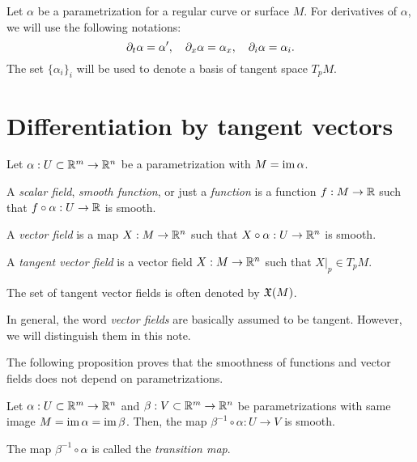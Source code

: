 \documentclass{../note}
\def\a{\alpha}
\begin{document}
\begin{notn*}
Let $\a$ be a parametrization for a regular curve or surface $M$.
For derivatives of $\a$, we will use the following notations:
\[\pd_t\a=\a',\quad\pd_x\a=\a_x,\quad\pd_i\a=\a_i.\]
The set $\{\a_i\}_i$ will be used to denote a basis of tangent space $T_pM$.
\end{notn*}





\section{Differentiation by tangent vectors}


\begin{defn}
Let $\a:U\subset\R^m\to\R^n$ be a parametrization with $M=\im\a$.
\begin{parts}
\item A \emph{scalar field}, \emph{smooth function}, or just a \emph{function} is a function $f:M\to\mathbb{R}$ such that $f\circ\a:U\to\R$ is smooth.
\item A \emph{vector field} is a map $X:M\to\mathbb{R}^n$ such that $X\circ\a:U\to\R^n$ is smooth.
\item A \emph{tangent vector field} is a vector field $X:M\to\mathbb{R}^n$ such that $X|_p\in T_pM$.
\end{parts}
The set of tangent vector fields is often denoted by $\mathfrak{X}(M)$.
\end{defn}
\begin{rmk}
In general, the word \emph{vector fields} are basically assumed to be tangent.
However, we will distinguish them in this note.
\end{rmk}

The following proposition proves that the smoothness of functions and vector fields does not depend on parametrizations.

\begin{prop}
Let $\a:U\subset\R^m\to\R^n$ and $\beta:V\subset\mathbb{R}^m\to\mathbb{R}^n$ be parametrizations with same image $M=\im\a=\im\beta$.
Then, the map $\beta^{-1}\circ\a:U\to V$ is smooth.
\end{prop}
\begin{pf}
\end{pf}
\begin{rmk}
The map $\beta^{-1}\circ\a$ is called the \emph{transition map}.
\end{rmk}
\end{document}
